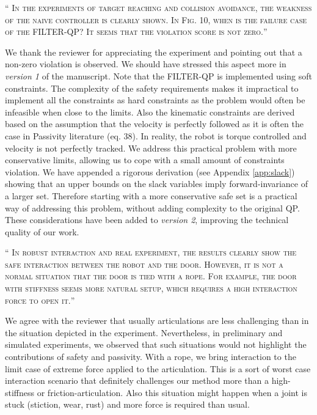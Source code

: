 \documentclass[10pt]{article}
\newcommand{\referee}[1]{\;
  \begin{minipage}[t]{.95\textwidth}
    ``{\small\color{red} \textsc{#1}}''
  \end{minipage}\medskip
  }
\newcommand{\version}[1]{\textit{version #1}}
\begin{document}
\begin{enumerate}[label={[R2:\,\arabic{enumi}]}]
\item\label{reply:R2:13} 
\referee{In the experiments of target reaching and collision avoidance, the weakness of the naive controller is clearly shown. In Fig. 10, when is the failure case of the FILTER-QP? It seems that the violation score is not zero.}

We thank the reviewer for appreciating the experiment and pointing out that a non-zero violation is observed. We should have stressed this aspect more in \version{1} of the manuscript. Note that the FILTER-QP is implemented using soft constraints. The complexity of the safety requirements makes it impractical to implement all the constraints as hard constraints as the problem would often be infeasible when close to the limits. Also the kinematic constraints are derived based on the assumption that the velocity is perfectly followed as it is often the case in Passivity literature (eq. 38). In reality, the robot is torque controlled and velocity is not perfectly tracked. We address this practical problem with more conservative limits, allowing us to cope with a small amount of constraints violation. We have appended a rigorous derivation (see Appendix \ref{app:slack}) showing that an upper bounds on the slack variables imply forward-invariance of a larger set. Therefore starting with a more conservative safe set is a practical way of addressing this problem, without adding complexity to the original QP. These considerations have been added to \version{2}, improving the technical quality of our work.

\item\label{reply:R2:14} 
\referee{In robust interaction and real experiment, the results clearly show the safe interaction between the robot and the door. However, it is not a normal situation that the door is tied with a rope. For example, the door with stiffness seems more natural setup, which requires a high interaction force to open it.}

We agree with the reviewer that usually articulations are less challenging than in the situation depicted in the experiment. Nevertheless, in preliminary and simulated experiments, we observed that such situations would not highlight the contributions of safety and passivity. With a rope, we bring interaction to the limit case of extreme force applied to the articulation. This is a sort of worst case interaction scenario that definitely challenges our method more than a high-stiffness or friction-articulation. Also this situation might happen when a joint is stuck (stiction, wear, rust) and more force is required than usual.


\end{enumerate}
\end{document}
